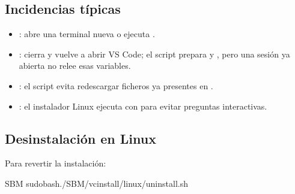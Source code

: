 \documentclass[letterpaper,10pt,english]{sphinxmanual}
\begin{document}
\subsection{Incidencias típicas}
\label{\detokenize{vscode:incidencias-tipicas}}\begin{itemize}
\item {} 
\sphinxAtStartPar
{}: abre una terminal nueva o ejecuta
.

\item {} 
\sphinxAtStartPar
{}: cierra y vuelve a abrir VS Code; el script
prepara  y , pero una sesión ya abierta no relee
esas variables.

\item {} 
\sphinxAtStartPar
{}: el script evita redescargar ficheros ya presentes en
.

\item {} 
\sphinxAtStartPar
{}: el instalador Linux ejecuta 
con  para evitar preguntas interactivas.

\end{itemize}


\subsection{Desinstalación en Linux}
\label{\detokenize{vscode:desinstalacion-en-linux}}
\sphinxAtStartPar
Para revertir la instalación:

\begin{sphinxVerbatim}[commandchars=\\\{\}]
SBM
sudobash./SBM/vc\PYGZhy{}install/linux/uninstall.sh
\end{sphinxVerbatim}
\end{document}
